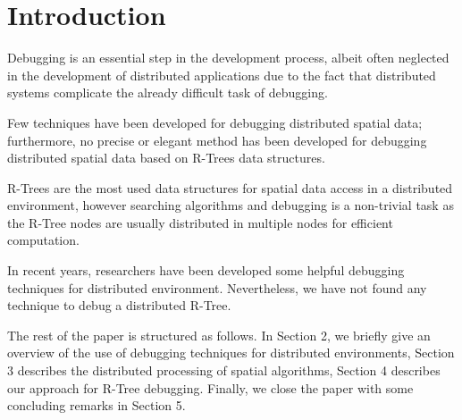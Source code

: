 \section{Introduction}

Debugging is an essential step in the development process, albeit often neglected in the development of distributed applications due to the fact that distributed systems complicate the already difficult task of debugging.

Few techniques have been developed for debugging distributed spatial data; furthermore, no precise or elegant method has been developed for debugging distributed spatial data based on R-Trees data structures.

R-Trees are the most used data structures for spatial data access in a distributed environment, however searching algorithms and debugging is a non-trivial task as the R-Tree nodes are usually distributed in multiple nodes for efficient computation.

In recent years, researchers have been developed some helpful debugging techniques for distributed environment. Nevertheless, we have not found any technique to debug a distributed R-Tree.

The rest of the paper is structured as follows. In Section 2,  we briefly give an overview of the use of debugging techniques for distributed environments, Section 3 describes the distributed processing of spatial algorithms, Section 4 describes our approach for R-Tree debugging. Finally, we close the paper with some concluding remarks in Section 5.

